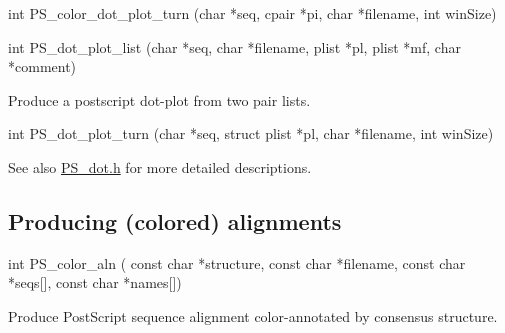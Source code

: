 \begin{DoxyVerb}int PS_color_dot_plot_turn (char *seq,
                            cpair *pi,
                            char *filename,
                            int winSize)
\end{DoxyVerb}


\begin{DoxyVerb}int PS_dot_plot_list (char *seq,
                      char *filename,
                      plist *pl,
                      plist *mf,
                      char *comment)
\end{DoxyVerb}
 Produce a postscript dot-\/plot from two pair lists.

\begin{DoxyVerb}int PS_dot_plot_turn (char *seq,
                      struct plist *pl,
                      char *filename,
                      int winSize)
\end{DoxyVerb}


\begin{DoxySeeAlso}{See also}
\hyperlink{PS__dot_8h}{P\+S\+\_\+dot.\+h} for more detailed descriptions.
\end{DoxySeeAlso}
\hypertarget{plots_utils_aln}{}\subsection{Producing (colored) alignments}\label{plots_utils_aln}
\begin{DoxyVerb}int PS_color_aln (
            const char *structure,
            const char *filename,
            const char *seqs[],
            const char *names[])
\end{DoxyVerb}
 Produce Post\+Script sequence alignment color-\/annotated by consensus structure. 